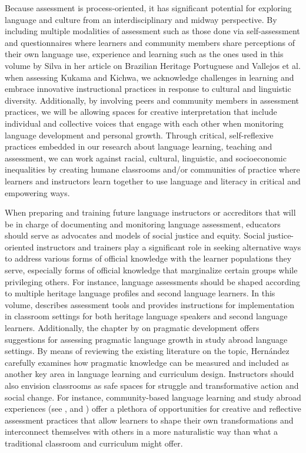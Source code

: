 \documentclass[output=paper]{langscibook}
\begin{document}
Because assessment is process-oriented, it has significant potential for exploring language and culture from an interdisciplinary and midway perspective. By including multiple modalities of assessment such as those done via self-as\-sess\-ment and questionnaires where learners and community members share perceptions of their own language use, experience and learning such as the ones used in this volume by Silva in her article on Brazilian Heritage Portuguese and Vallejos et al. when assessing Kukama and Kichwa, we acknowledge challenges in learning and embrace innovative instructional practices in response to cultural and linguistic diversity. Additionally, by involving peers and community members in assessment practices, we will be allowing spaces for creative interpretation that include individual and collective voices that engage with each other when monitoring language development and personal growth. Through critical, self-reflexive practices embedded in our research about language learning, teaching and assessment, we can work against racial, cultural, linguistic, and socioeconomic inequalities by creating humane classrooms and/or communities of practice where learners and instructors learn together to use language and literacy in critical and empowering ways.

When preparing and training future language instructors or accreditors that will be in charge of documenting and monitoring language assessment, educators should serve as advocates and models of social justice and equity. Social justice-oriented instructors and trainers play a significant role in seeking alternative ways to address various forms of official knowledge with the learner populations they serve, especially forms of official knowledge that marginalize certain groups while privileging others. For instance, language assessments should be shaped according to multiple heritage language profiles and second language learners. In this volume,  describes assessment tools and provides instructions for implementation in classroom settings for both heritage language speakers and second language learners. Additionally, the chapter by  on pragmatic development offers suggestions for assessing pragmatic language growth in study abroad language settings. By means of reviewing the existing literature on the topic, Hernández carefully examines how pragmatic knowledge can be measured and included as another key area in language learning and curriculum design. Instructors should also envision classrooms as safe spaces for struggle and transformative action and social change. For instance, community-based language learning and study abroad experiences (see ,  and ) offer a plethora of opportunities for creative and reflective assessment practices that allow learners to shape their own transformations and interconnect themselves with others in a more naturalistic way than what a traditional classroom and curriculum might offer.
\end{document}
